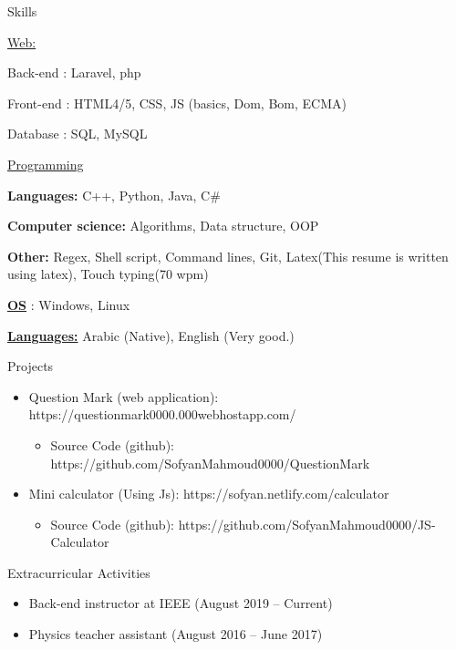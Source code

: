 \documentclass{resume}
\begin{document}

\begin{rSection}{Skills}
    \begin{rSubsection}{\underline{Web:}}{}{}{}
        \item Back-end  : Laravel, php
        \item Front-end : HTML4/5, CSS, JS (basics, Dom, Bom, ECMA)
        \item Database  : SQL, MySQL
    \end{rSubsection}

    \begin{rSubsection}{\underline{Programming}}{}{}{}
        \item \textbf{Languages:} C++, Python, Java, C\#
        \item \textbf{Computer science:} Algorithms, Data structure, OOP 
        \item \textbf{Other:} Regex, Shell script, Command lines, Git, Latex(This resume is written using latex), Touch typing(70 wpm)
    \end{rSubsection}

    \underline{\bf OS} : Windows, Linux

    \bigskip

    \underline{\bf Languages:} Arabic (Native), English (Very good.) 

    
\end{rSection}

\pagebreak


\begin{rSection}{Projects}
    \begin{itemize}
        \item Question Mark (web application): https://questionmark0000.000webhostapp.com/
        \begin{itemize}
            \item Source Code (github): https://github.com/SofyanMahmoud0000/QuestionMark
        \end{itemize}
        \item Mini calculator (Using Js): https://sofyan.netlify.com/calculator
        \begin{itemize}
            \item Source Code (github): https://github.com/SofyanMahmoud0000/JS-Calculator
        \end{itemize}
    \end{itemize}
\end{rSection}

\begin{rSection}{Extracurricular Activities}
    \begin{itemize}
        \item Back-end instructor at IEEE (August 2019 – Current)
        \item Physics teacher assistant (August 2016 – June 2017)
    \end{itemize}
\end{rSection}
\end{document}
